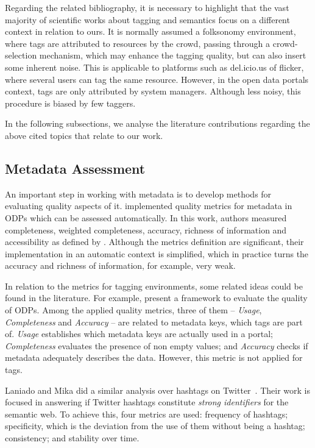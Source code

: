 Regarding the related bibliography, it is necessary to highlight that the vast majority of scientific works about tagging and semantics focus on a different context in relation to ours.
It is normally assumed a folksonomy environment, where tags are attributed to resources by the crowd, passing through a crowd-selection mechanism, which may enhance the tagging quality, but can also insert some inherent noise.
This is applicable to platforms such as del.icio.us of flicker, where several users can tag the same resource.
However, in the open data portals context, tags are only attributed by system managers.
Although less noisy, this procedure is biased by few taggers.

In the following subsections, we analyse the literature contributions regarding the above cited topics that relate to our work.

\subsection{Metadata Assessment}
\label{sec:metadata_assessment}

An important step in working with metadata is to develop methods for evaluating quality aspects of it.
 implemented quality metrics for metadata in ODPs which can be assessed automatically.
In this work, authors measured completeness, weighted completeness, accuracy, richness of information and accessibility as defined by .
Although the metrics definition are significant, their implementation in an automatic context is simplified, which in practice turns the accuracy and richness of information, for example, very weak.

In relation to the metrics for tagging environments, some related ideas could be found in the literature.
For example,  present a framework to evaluate the quality of ODPs. 
Among the applied quality metrics, three of them -- \emph{Usage}, \emph{Completeness} and \emph{Accuracy} -- are related to metadata keys, which tags are part of. 
\emph{Usage} establishes which metadata keys are actually used in a portal; \emph{Completeness} evaluates the presence of non empty values; and \emph{Accuracy} checks if metadata adequately describes the data.
However, this metric is not applied for tags.

Laniado and Mika did a similar analysis over hashtags on Twitter~\cite{Laniado2010}.
Their work is focused in answering if Twitter hashtags constitute \emph{strong identifiers} for the semantic web. 
To achieve this, four metrics are used: frequency of hashtags; specificity, which is the deviation from the use of them without being a hashtag; consistency; and stability over time.

